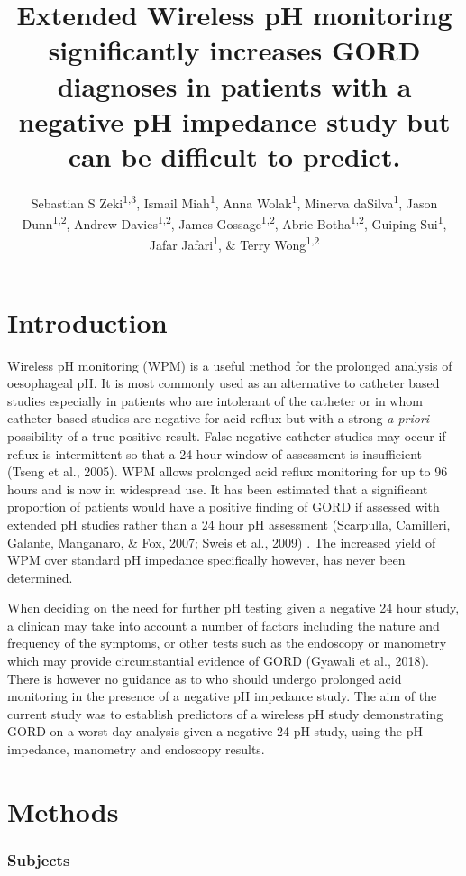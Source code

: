 \documentclass[english,man,floatsintext]{apa6}
\author{Sebastian S Zeki\textsuperscript{1,3}, Ismail Miah\textsuperscript{1}, Anna Wolak\textsuperscript{1}, Minerva daSilva\textsuperscript{1}, Jason Dunn\textsuperscript{1,2}, Andrew Davies\textsuperscript{1,2}, James Gossage\textsuperscript{1,2}, Abrie Botha\textsuperscript{1,2}, Guiping Sui\textsuperscript{1}, Jafar Jafari\textsuperscript{1}, \& Terry Wong\textsuperscript{1,2}}
\affiliation{
\vspace{0.5cm}
\textsuperscript{1} Centre for Oeosphageal Diseases, Guy's and St. Thomas Hospital, Westminster Bridge Road, London\\\textsuperscript{2} Karolinska Instituet, Karolinska,Sweden\\\textsuperscript{3} Bart's Cancer Institute,Charterhouse Square, London}
\title{Extended Wireless pH monitoring significantly increases GORD diagnoses in patients with a negative pH impedance study but can be difficult to predict.}
\date{}
\begin{document}
\maketitle

\hypertarget{introduction}{%
\section{Introduction}\label{introduction}}

Wireless pH monitoring (WPM) is a useful method for the prolonged analysis of oesophageal pH. It is most commonly used as an alternative to catheter based studies especially in patients who are intolerant of the catheter or in whom catheter based studies are negative for acid reflux but with a strong \emph{a priori} possibility of a true positive result. False negative catheter studies may occur if reflux is intermittent so that a 24 hour window of assessment is insufficient (Tseng et al., 2005). WPM allows prolonged acid reflux monitoring for up to 96 hours and is now in widespread use. It has been estimated that a significant proportion of patients would have a positive finding of GORD if assessed with extended pH studies rather than a 24 hour pH assessment (Scarpulla, Camilleri, Galante, Manganaro, \& Fox, 2007; Sweis et al., 2009) . The increased yield of WPM over standard pH impedance specifically however, has never been determined.

When deciding on the need for further pH testing given a negative 24 hour study, a clinican may take into account a number of factors including the nature and frequency of the symptoms, or other tests such as the endoscopy or manometry which may provide circumstantial evidence of GORD (Gyawali et al., 2018). There is however no guidance as to who should undergo prolonged acid monitoring in the presence of a negative pH impedance study. The aim of the current study was to establish predictors of a wireless pH study demonstrating GORD on a worst day analysis given a negative 24 pH study, using the pH impedance, manometry and endoscopy results.

\hypertarget{methods}{%
\section{Methods}\label{methods}}

\hypertarget{subjects}{%
\subsubsection{Subjects}\label{subjects}}
\end{document}
